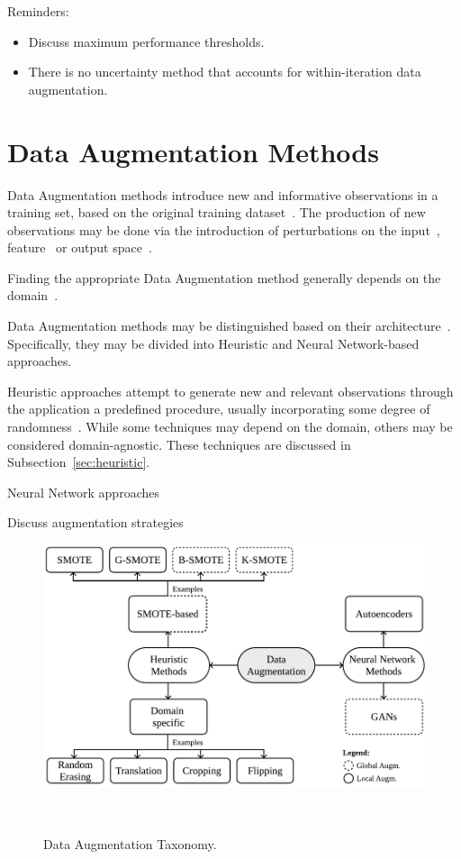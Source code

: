 \documentclass[parskip=full]{scrartcl}
\begin{document}
Reminders:
\begin{itemize}
    \item Discuss maximum performance thresholds.
    \item There is no uncertainty method that accounts for within-iteration
        data augmentation.
\end{itemize}


\section{Data Augmentation Methods}

Data Augmentation methods introduce new and informative observations in a
training set, based on the original training dataset~\cite{Behpour2019}. The
production of new observations may be done via the introduction of
perturbations on the input~\cite{Zhong2020}, feature~\cite{DeVries2017} or output
space~\cite{Behpour2019}.

Finding the appropriate Data Augmentation method generally depends on the
domain~\cite{DeVries2017}.

Data Augmentation methods may be distinguished based on their
architecture~\cite{Shorten2019}. Specifically, they may be divided into
Heuristic and Neural Network-based approaches. 

Heuristic approaches attempt to generate new and relevant observations through
the application a predefined procedure, usually incorporating some degree of
randomness~\cite{Kashefi2020}. While some techniques may depend on the domain,
others may be considered domain-agnostic. These techniques are discussed in
Subsection~\ref{sec:heuristic}.

Neural Network approaches 

Discuss augmentation strategies

\begin{figure}[H]
	\centering
	\includegraphics[width=.8\linewidth]{../analysis/data_augmentation_taxonomy}
    \caption{%
        Data Augmentation Taxonomy.
    }~\label{fig:data_augmentation_taxonomy}
\end{figure}
\end{document}
